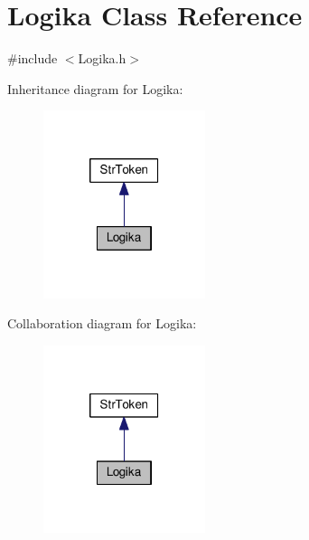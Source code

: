 \hypertarget{class_logika}{\section{Logika Class Reference}
\label{class_logika}
}


{\ttfamily \#include $<$Logika.\-h$>$}



Inheritance diagram for Logika\-:\nopagebreak
\begin{figure}[H]
\begin{center}
\leavevmode
\includegraphics[width=134pt]{class_logika__inherit__graph}
\end{center}
\end{figure}


Collaboration diagram for Logika\-:\nopagebreak
\begin{figure}[H]
\begin{center}
\leavevmode
\includegraphics[width=134pt]{class_logika__coll__graph}
\end{center}
\end{figure}
